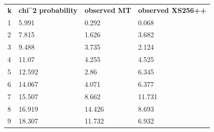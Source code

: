 \documentclass[
]{article}
\begin{document}
\begin{table}[]
\begin{tabular}{llll}
\rowcolor[HTML]{4472C4} 
{\color[HTML]{FFF} \textbf{k}} & {\color[HTML]{FFF} \textbf{chi\textasciicircum{}2   probability}} & {\color[HTML]{FFF} \textbf{observed   MT}} & {\color[HTML]{FFF} \textbf{observed XS256++}} \\
\rowcolor[HTML]{D9E1F2} 
1                              & 5.991                                                             & 0.292                                      & 0.068                                         \\
2                              & 7.815                                                             & 1.626                                      & 3.682                                         \\
\rowcolor[HTML]{D9E1F2} 
3                              & 9.488                                                             & 3.735                                      & 2.124                                         \\
4                              & 11.07                                                             & 4.255                                      & 4.525                                         \\
\rowcolor[HTML]{D9E1F2} 
5                              & 12.592                                                            & 2.86                                       & 6.345                                         \\
6                              & 14.067                                                            & 4.071                                      & 6.377                                         \\
\rowcolor[HTML]{D9E1F2} 
7                              & 15.507                                                            & 8.662                                      & 11.731                                        \\
8                              & 16.919                                                            & 14.426                                     & 8.693                                         \\
\rowcolor[HTML]{D9E1F2} 
9                              & 18.307                                                            & 11.732                                     & 6.932                                         \\

\end{tabular}
\end{table}
\end{document}
